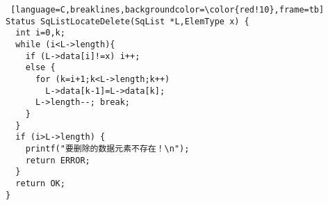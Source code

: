 \begin{lstlisting} [language=C,breaklines,backgroundcolor=\color{red!10},frame=tb]
Status SqListLocateDelete(SqList *L,ElemType x) {
  int i=0,k;
  while (i<L->length){
    if (L->data[i]!=x) i++;
    else {
      for (k=i+1;k<L->length;k++)
        L->data[k-1]=L->data[k];
      L->length--; break;
    }
  }
  if (i>L->length) {
    printf("要删除的数据元素不存在！\n");
    return ERROR;
  }
  return OK;
}
\end{lstlisting}
